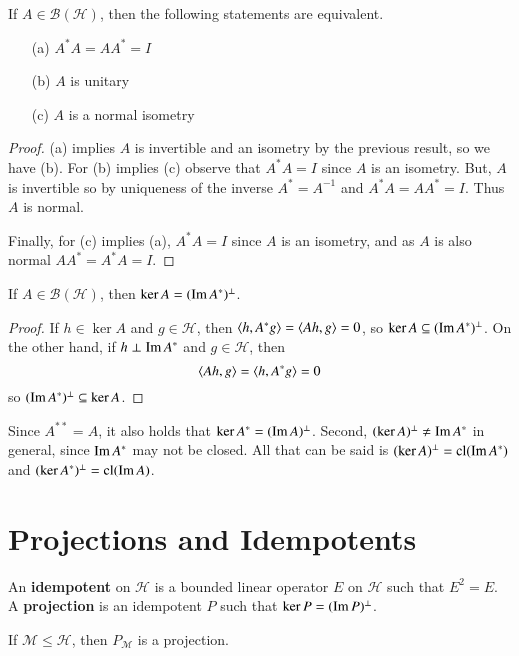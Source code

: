 \begin{prop}
    If $A \in \mathscr{B}(\mathscr{H})$, then the following statements are equivalent. \begin{enumerate}
        \item[(a)] $A^*A = AA^* = I$
        \item[(b)] $A$ is unitary
        \item[(c)] $A$ is a normal isometry
    \end{enumerate}
\end{prop}
\begin{proof}
    (a) implies $A$ is invertible and an isometry by the previous result, so we have (b). For (b) implies (c) observe that $A^*A = I$ since $A$ is an isometry. But, $A$ is invertible so by uniqueness of the inverse $A^* = A^{-1}$ and $A^*A = AA^* = I$. Thus $A$ is normal.

    Finally, for (c) implies (a), $A^*A = I$ since $A$ is an isometry, and as $A$ is also normal $AA^* = A^*A = I$.
\end{proof}

\begin{thm}
    If $A \in \mathscr{B}(\mathscr{H})$, then $\ker A = (\operatorname{Im} A^*)^{\perp}$.
\end{thm}
\begin{proof}
    If $h \in \ker A$ and $g \in \mathscr{H}$, then $\left\langle h, A^*g\right\rangle = \left\langle Ah, g\right\rangle = 0$, so $\ker A \subseteq (\operatorname{Im} A^*)^{\perp}$. On the other hand, if $h \perp \operatorname{Im} A^*$ and $g \in \mathscr{H}$, then $$\left\langle Ah, g\right\rangle = \left\langle h, A^*g\right\rangle = 0$$
    so $(\operatorname{Im} A^*)^{\perp} \subseteq \ker A$.
\end{proof}
Since $A^{**} = A$, it also holds that $\ker A^* = (\operatorname{Im} A)^{\perp}$. Second, $(\ker A)^{\perp} \neq \operatorname{Im} A^*$ in general, since $\operatorname{Im} A^*$ may not be closed. All that can be said is $(\ker A)^{\perp} = \text{cl}(\operatorname{Im} A^*)$ and $(\ker A^*)^{\perp} = \text{cl}(\operatorname{Im} A)$.


\section{Projections and Idempotents}
\label{sec:ProjId}

\begin{defn}
    An \textbf{idempotent} on $\mathscr{H}$ is a bounded linear operator $E$ on $\mathscr{H}$ such that $E^2= E$. A \textbf{projection} is an idempotent $P$ such that $\ker P = (\operatorname{Im} P)^{\perp}$.
\end{defn}
If $\mathcal{M} \leq \mathscr{H}$, then $P_{\mathcal{M}}$ is a projection.

